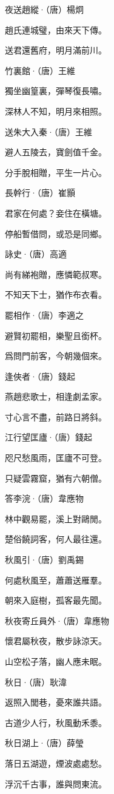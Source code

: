 \documentclass[12pt,a4paper]{ctexbook}
\begin{document}
夜送趙縱·（唐）楊炯\par
趙氏連城璧，由來天下傳。\par
送君還舊府，明月滿前川。\par
竹裏館·（唐）王維\par
獨坐幽篁裏，彈琴復長嘯。\par
深林人不知，明月來相照。\par
送朱大入秦·（唐）王維\par
避人五陵去，寶劍值千金。\par
分手脫相贈，平生一片心。\par
長幹行·（唐）崔顥\par
君家在何處？妾住在橫塘。\par
停船暫借問，或恐是同鄉。\par
詠史·（唐）高適\par
尚有綈袍贈，應憐範叔寒。\par
不知天下士，猶作布衣看。\par
罷相作·（唐）李適之\par
避賢初罷相，樂聖且銜杯。\par
爲問門前客，今朝幾個來。\par
逢俠者·（唐）錢起\par
燕趙悲歌士，相逢劇孟家。\par
寸心言不盡，前路日將斜。\par
江行望匡廬·（唐）錢起\par
咫尺愁風雨，匡廬不可登。\par
只疑雲霧窟，猶有六朝僧。\par
答李浣·（唐）韋應物\par
林中觀易罷，溪上對鷗閒。\par
楚俗饒詞客，何人最往還。\par
秋風引·（唐）劉禹錫\par
何處秋風至，蕭蕭送雁羣。\par
朝來入庭樹，孤客最先聞。\par
秋夜寄丘員外·（唐）韋應物\par
懷君屬秋夜，散步詠涼天。\par
山空松子落，幽人應未眠。\par
秋日·（唐）耿湋\par
返照入閭巷，憂來誰共語。\par
古道少人行，秋風動禾黍。\par
秋日湖上·（唐）薛瑩\par
落日五湖遊，煙波處處愁。\par
浮沉千古事，誰與問東流。\par
\end{document}
